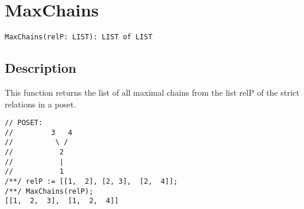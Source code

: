 \documentclass[a4paper]{mybook}
\newenvironment{command}{}{} %
\begin{document}
\section{MaxChains}
\label{MaxChains}
\begin{command} %


\begin{Verbatim}[label=syntax, rulecolor=\color{MidnightBlue},
frame=single]
MaxChains(relP: LIST): LIST of LIST
\end{Verbatim}


\subsection*{Description}

This function returns the list of all maximal chains from the list relP of the strict relations in a poset.
\par 
\begin{Verbatim}[label=example, rulecolor=\color{PineGreen}, frame=single]
// POSET:
//         3   4
//          \ /
//           2
//           |
//           1
/**/ relP := [[1,  2], [2, 3],  [2,  4]];
/**/ MaxChains(relP);
[[1,  2,  3],  [1,  2,  4]]
\end{Verbatim}


\end{command} %
\end{document}
